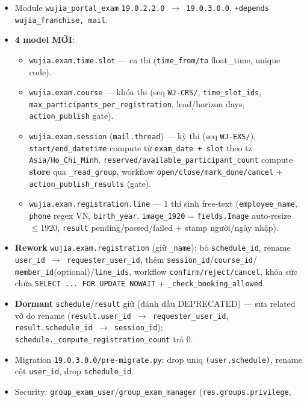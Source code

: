 \begin{itemize}
  \item Module \texttt{wujia\_portal\_exam} \texttt{19.0.2.2.0 $\to$ 19.0.3.0.0}, \texttt{+depends
    wujia\_franchise, mail}.
  \item \textbf{4 model MỚI}:
    \begin{itemize}
      \item \texttt{wujia.exam.time.slot} --- ca thi (\texttt{time\_from/to} float\_time, unique code).
      \item \texttt{wujia.exam.course} --- khóa thi (seq \texttt{WJ-CRS/}, \texttt{time\_slot\_ids},
        \texttt{max\_participants\_per\_registration}, lead/horizon days, \texttt{action\_publish} gate).
      \item \texttt{wujia.exam.session} (\texttt{mail.thread}) --- kỳ thi (seq \texttt{WJ-EXS/}),
        \texttt{start/end\_datetime} compute từ \texttt{exam\_date + slot} theo tz \texttt{Asia/Ho\_Chi\_Minh},
        \texttt{reserved/available\_participant\_count} compute \textbf{store} qua \texttt{\_read\_group},
        workflow \texttt{open/close/mark\_done/cancel} + \texttt{action\_publish\_results} (gate).
      \item \texttt{wujia.exam.registration.line} --- 1 thí sinh free-text (\texttt{employee\_name},
        \texttt{phone} regex VN, \texttt{birth\_year}, \texttt{image\_1920} = \texttt{fields.Image}
        auto-resize $\le$1920, \texttt{result} pending/passed/failed + stamp người/ngày nhập).
    \end{itemize}
  \item \textbf{Rework} \texttt{wujia.exam.registration} (giữ \texttt{\_name}): bỏ \texttt{schedule\_id},
    rename \texttt{user\_id $\to$ requester\_user\_id}, thêm \texttt{session\_id}/\texttt{course\_id}/
    \texttt{member\_id}(optional)/\texttt{line\_ids}, workflow \texttt{confirm/reject/cancel},
    khóa sức chứa \texttt{SELECT ... FOR UPDATE NOWAIT} + \texttt{\_check\_booking\_allowed}.
  \item \textbf{Dormant} \texttt{schedule}/\texttt{result} giữ (đánh dấu DEPRECATED) --- sửa related vỡ
    do rename (\texttt{result.user\_id $\to$ requester\_user\_id}, \texttt{result.schedule\_id $\to$
    session\_id}); \texttt{schedule.\_compute\_registration\_count} trả 0.
  \item Migration \texttt{19.0.3.0.0/pre-migrate.py}: drop uniq \texttt{(user,schedule)}, rename cột
    \texttt{user\_id}, drop \texttt{schedule\_id}.
  \item Security: \texttt{group\_exam\_user}/\texttt{group\_exam\_manager} (\texttt{res.groups.privilege},

\end{itemize}
